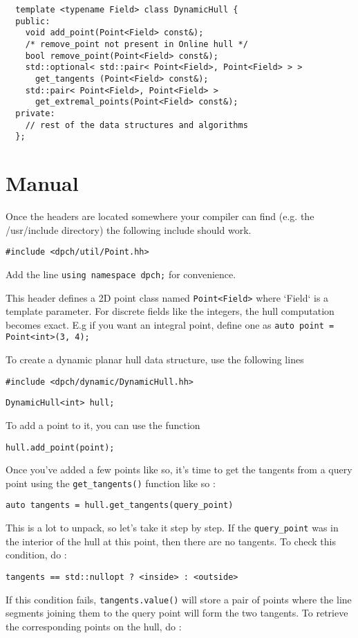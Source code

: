 \documentclass[10pt, letterpaper]{article}
\begin{document}
\begin{verbatim}
  template <typename Field> class DynamicHull {
  public:
    void add_point(Point<Field> const&);
    /* remove_point not present in Online hull */
    bool remove_point(Point<Field> const&);
    std::optional< std::pair< Point<Field>, Point<Field> > >
      get_tangents (Point<Field> const&);
    std::pair< Point<Field>, Point<Field> >
      get_extremal_points(Point<Field> const&);
  private:
    // rest of the data structures and algorithms
  };
\end{verbatim}


\section{Manual}

Once the headers are located somewhere your compiler can find
(e.g. the /usr/include directory) the following include should work.

\verb|#include <dpch/util/Point.hh>|

Add the line \verb|using namespace dpch;| for convenience.

This header defines a 2D point class named \verb|Point<Field>| where 
`Field` is a template parameter.
For discrete fields like the integers, the hull computation becomes exact.
E.g if you want an integral point, define one as
\verb|auto point = Point<int>(3, 4);|

To create a dynamic planar hull data structure, use the following lines

\verb|#include <dpch/dynamic/DynamicHull.hh>|

\verb|DynamicHull<int> hull;|

To add a point to it, you can use the function

\verb|hull.add_point(point);|

Once you've added a few points like so, it's time to get the tangents from a
query point using the \verb|get_tangents()| function like so :

\verb|auto tangents = hull.get_tangents(query_point)|

This is a lot to unpack, so let's take it step by step.
If the \verb|query_point| was in the interior of the hull at this point,
then there are no tangents. To check this condition, do :

\verb|tangents == std::nullopt ? <inside> : <outside>|

If this condition fails, \verb|tangents.value()| will store a pair of points
where the line segments joining them to the query point will form the two
tangents. To retrieve the corresponding points on the hull, do :
\end{document}
